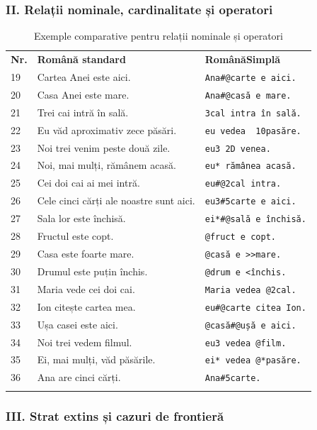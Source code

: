 \documentclass[12pt,onecolumn,letterpaper]{article}
\newcommand{\rs}[1]{\texttt{#1}}
\newcommand{\RStablelayout}{%
\footnotesize
\setlength{\tabcolsep}{6pt}%
\renewcommand{\arraystretch}{1.12}%
\arrayrulecolor{RSRule}%
}
\begin{document}
\subsubsection{II. Relații nominale, cardinalitate și operatori}

\RStablelayout
\begin{longtable}{@{}p{0.6cm}p{5.4cm}p{5.5cm}@{}}
\rowcolor{RSGray}
\textbf{Nr.} & \textbf{Română standard} & \textbf{RomânăSimplă} \\
19 & Cartea Anei este aici. & \rs{Ana\#@carte e aici.} \\
20 & Casa Anei este mare. & \rs{Ana\#@casă e mare.} \\
21 & Trei cai intră în sală. & \rs{3cal intra în sală.} \\
22 & Eu văd aproximativ zece păsări. & \rs{eu vedea ~10pasăre.} \\
23 & Noi trei venim peste două zile. & \rs{eu3 2D venea.} \\
24 & Noi, mai mulți, rămânem acasă. & \rs{eu* rămânea acasă.} \\
25 & Cei doi cai ai mei intră. & \rs{eu\#@2cal intra.} \\
26 & Cele cinci cărți ale noastre sunt aici. & \rs{eu3\#5carte e aici.} \\
27 & Sala lor este închisă. & \rs{ei*\#@sală e închisă.} \\
28 & Fructul este copt. & \rs{@fruct e copt.} \\
29 & Casa este foarte mare. & \rs{@casă e >>mare.} \\
30 & Drumul este puțin închis. & \rs{@drum e <închis.} \\
31 & Maria vede cei doi cai. & \rs{Maria vedea @2cal.} \\
32 & Ion citește cartea mea. & \rs{eu\#@carte citea Ion.} \\
33 & Ușa casei este aici. & \rs{@casă\#@ușă e aici.} \\
34 & Noi trei vedem filmul. & \rs{eu3 vedea @film.} \\
35 & Ei, mai mulți, văd păsările. & \rs{ei* vedea @*pasăre.} \\
36 & Ana are cinci cărți. & \rs{Ana\#5carte.} \\
\bottomrule
\caption{Exemple comparative pentru relații nominale și operatori}
\end{longtable}

\subsubsection{III. Strat extins și cazuri de frontieră}
\end{document}
